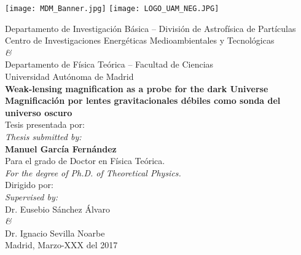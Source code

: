\newpage
\thispagestyle{empty}
\begin{center}

\texttt{[image: MDM\_Banner.jpg]}
\texttt{[image: LOGO\_UAM\_NEG.JPG]}

\vspace{1cm}
Departamento de Investigaci\'on B\'asica -- Divisi\'on de Astrof\'isica de Part\'iculas\\
Centro de Investigaciones Energ\'eticas Medioambientales y Tecnol\'ogicas\\
\vspace{0.3cm}
{\it \&}\\
\vspace{0.3cm}
Departamento de F\'isica Te\'orica -- Facultad de Ciencias\\
Universidad Aut\'onoma de Madrid\\
\vspace{2cm}
{\bf \LARGE Weak-lensing magnification as a probe for the dark Universe}\\
\vspace{1cm}
{\bf \LARGE Magnificaci\'on por lentes gravitacionales d\'ebiles como sonda del universo oscuro}\\
\vspace{2cm}
Tesis presentada por:\\{\it Thesis submitted by:}\\
{\bf Manuel Garc\'ia Fern\'andez}\\
Para el grado de Doctor en F\'isica Te\'orica.\\{\it For the degree of Ph.D. of Theoretical Physics.}\\
\vspace{1cm}
Dirigido por:\\
{\it Supervised by:}\\
Dr. Eusebio S\'anchez \'Alvaro\\
{\it \&}\\
Dr. Ignacio Sevilla Noarbe\\
\vspace{1cm}
Madrid, Marzo-XXX del 2017

\end{center}